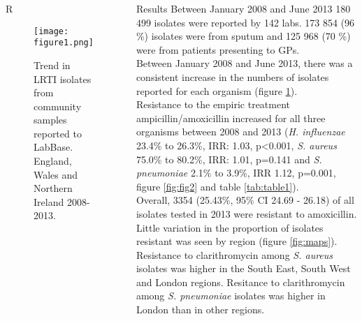 \documentclass[final, 14pt]{beamer}
\begin{document}
\begin{frame}
\begin{columns}[t]
\begin{minipage}[T]{.95\textwidth}
\begin{block}{\textcolor{comp_blue}{R}}  
    \begin{figure}
   \texttt{[image: figure1.png]}
   \caption{Trend in LRTI isolates from community samples reported to LabBase. England, Wales and Northern Ireland 2008-2013.}
   \label{fig:fig1}
   \end{figure}

\end{block}  
\end{minipage}
  
 \begin{minipage}[T]{.95\textwidth} %
  \begin{block}{Results}
   Between January 2008 and June 2013 180 499 isolates were reported by 142 labs. 
   173 854 (96 \%) isolates were from sputum and 125 968 (70 \%) were from patients presenting to GPs. \\
   Between January 2008 and June 2013, there was a consistent increase in the numbers of isolates reported for each organism (figure \ref{fig:fig1}).\\
Resistance to the empiric treatment ampicillin/amoxicillin increased for all three organisms between 2008 and 2013 (\textit{H. influenzae} 23.4\% to 26.3\%, IRR: 1.03, p\textless0.001, \textit{S. aureus} 75.0\% to 80.2\%, IRR: 1.01, p=0.141 and \textit{S. pneumoniae} 2.1\% to 3.9\%, IRR 1.12, p=0.001, figure \ref{fig:fig2} and table \ref{tab:table1}).\\
   Overall, 3354 (25.43\%, 95\% CI 24.69 - 26.18) of all isolates tested in 2013 were resistant to amoxicillin. \\%
   Little variation in the proportion of isolates resistant was seen by region (figure \ref{fig:maps}). 
   Resistance to clarithromycin among \textit{S. aureus} isolates was higher in the South East, South West and London regions. 
   Resitance to clarithromycin among \textit{S. pneumoniae} isolates was higher in London than in other regions. \\
   \vspace{1 cm}
     \begin{table}

\end{table}
\end{block}
\end{minipage}
\end{columns}
\end{frame}
\end{document}
